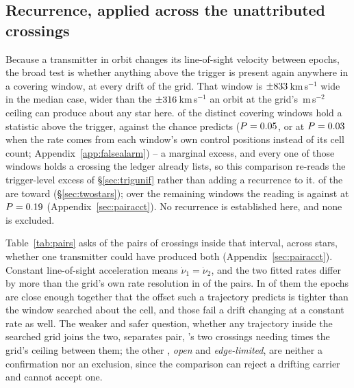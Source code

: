\subsection{Recurrence, applied across the unattributed crossings}
\label{sec:etacrv}

Because a transmitter in orbit changes its line-of-sight velocity between
epochs, the broad test is whether anything above the trigger is present again
anywhere in a covering window, at every drift of the grid. That window is $\pm833$\,km\,s$^{-1}$ wide in the median case, wider
than the $\pm316$\,km\,s$^{-1}$ an orbit at the grid's
\WdAGrid\,m\,s$^{-2}$ ceiling can produce about any star here. \WuNWinExc{} of the \WuNWin{} distinct covering windows hold a
statistic above the trigger, against the \WuExpWin{} chance predicts
($P=0.05$, or \WuExpWinCtrl{} at $P=0.03$ when the rate
comes from each window's own control positions instead of its cell count;
Appendix~\ref{app:falsealarm}) -- a marginal excess, and every one of those
windows holds a crossing the ledger already lists, so this comparison re-reads
the trigger-level excess of \S\ref{sec:trigunif} rather than adding a
recurrence to it. \WuNWinExcTwo{} of the \WuNWinExc{} are toward
\WuTwoStars{} (\S\ref{sec:twostars}); over the remaining \WuNWinRest{} windows
the reading is \WuNWinRestExc{} against \WuExpRest{} at $P=0.19$
(Appendix~\ref{sec:pairacct}). No recurrence is established here, and none is excluded.

Table~\ref{tab:pairs} asks of the \TjNPair{} pairs of crossings inside that
interval, across \TjNStarPair{} stars, whether one transmitter could have
produced both (Appendix~\ref{sec:pairacct}). Constant line-of-sight acceleration means
$\dot\nu_1=\dot\nu_2$, and the two fitted rates differ by more than the grid's
own rate resolution in \TjNUneqDrift{} of the \TjNPair{} pairs. In
\TjNPower{} of them the epochs are close enough together that the offset such
a trajectory predicts is tighter than the window searched about the cell, and
those \TjNPower{} fail a drift changing at a constant rate as well. The weaker and
safer question, whether any trajectory inside the searched grid joins the two,
separates \TjNExcl{} pair, \EcGridStar's two crossings needing \EcGridFactor{}
times the grid's ceiling between them; the other \TjNOpen, \TjNOpenPlain{}
\emph{open} and \TjNPairEdge{} \emph{edge-limited}, are neither a confirmation
nor an exclusion, since the comparison can reject a drifting carrier and cannot
accept one.

